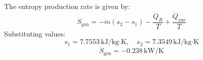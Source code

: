 The entropy production rate is given by:  
\[
\dot{S}_{\text{gen}} = -\dot{m}(s_2 - s_1) - \frac{\dot{Q}_R}{T} + \frac{\dot{Q}_{\text{aus}}}{T}
\]  
Substituting values:  
\[
s_1 = 7.7553 \, \text{kJ/kg·K}, \quad s_2 = 7.3549 \, \text{kJ/kg·K}
\]  
\[
\dot{S}_{\text{gen}} = -0.238 \, \text{kW/K}
\]